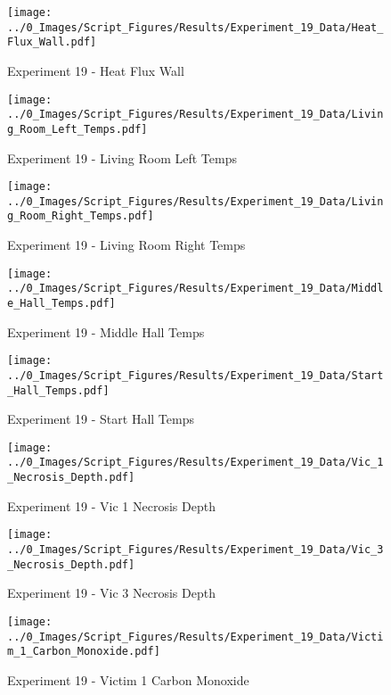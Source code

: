 	\clearpage

	\begin{figure}[H]
		\centering
		\texttt{[image: ../0\_Images/Script\_Figures/Results/Experiment\_19\_Data/Heat\_Flux\_Wall.pdf]}
		\caption[]{Experiment 19 - Heat Flux Wall}
	\end{figure}
 

	\begin{figure}[H]
		\centering
		\texttt{[image: ../0\_Images/Script\_Figures/Results/Experiment\_19\_Data/Living\_Room\_Left\_Temps.pdf]}
		\caption[]{Experiment 19 - Living Room Left Temps}
	\end{figure}
 
	\clearpage

	\begin{figure}[H]
		\centering
		\texttt{[image: ../0\_Images/Script\_Figures/Results/Experiment\_19\_Data/Living\_Room\_Right\_Temps.pdf]}
		\caption[]{Experiment 19 - Living Room Right Temps}
	\end{figure}
 

	\begin{figure}[H]
		\centering
		\texttt{[image: ../0\_Images/Script\_Figures/Results/Experiment\_19\_Data/Middle\_Hall\_Temps.pdf]}
		\caption[]{Experiment 19 - Middle Hall Temps}
	\end{figure}
 
	\clearpage

	\begin{figure}[H]
		\centering
		\texttt{[image: ../0\_Images/Script\_Figures/Results/Experiment\_19\_Data/Start\_Hall\_Temps.pdf]}
		\caption[]{Experiment 19 - Start Hall Temps}
	\end{figure}
 

	\begin{figure}[H]
		\centering
		\texttt{[image: ../0\_Images/Script\_Figures/Results/Experiment\_19\_Data/Vic\_1\_Necrosis\_Depth.pdf]}
		\caption[]{Experiment 19 - Vic 1 Necrosis Depth}
	\end{figure}
 
	\clearpage

	\begin{figure}[H]
		\centering
		\texttt{[image: ../0\_Images/Script\_Figures/Results/Experiment\_19\_Data/Vic\_3\_Necrosis\_Depth.pdf]}
		\caption[]{Experiment 19 - Vic 3 Necrosis Depth}
	\end{figure}
 

	\begin{figure}[H]
		\centering
		\texttt{[image: ../0\_Images/Script\_Figures/Results/Experiment\_19\_Data/Victim\_1\_Carbon\_Monoxide.pdf]}
		\caption[]{Experiment 19 - Victim 1 Carbon Monoxide}
	\end{figure}
 
